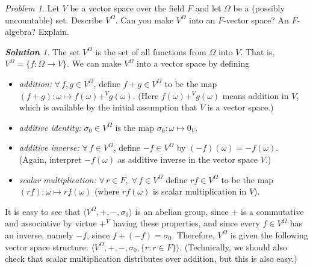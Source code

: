 \documentclass[11pt]{paper}
\theoremstyle{remark}
\newtheorem{problem}{Problem}
\newtheorem*{solution}{{\bf Solution}}
\newcommand\0{\ensuremath{\mathbf{0}}}
\newcommand{\<}{\ensuremath{\langle}}
\renewcommand{\>}{\ensuremath{\rangle}}
\begin{document}
\begin{problem}
Let $V$ be a vector space over the field $F$ and let $\Omega$ be a (possibly
uncountable) set.  Describe $V^\Omega$.  Can you make 
$V^\Omega$ into an  $F$-vector space?  An $F$-algebra? Explain.
\end{problem}
\begin{solution}
The set $V^\Omega$ is the set of all functions from $\Omega$ into $V$. 
That is, $V^\Omega = \{f : \Omega \rightarrow V\}$. We can make $V^\Omega$ into a
vector space by defining
\begin{itemize}
\item {\it addition:} 
  $\forall \,f, g \in V^\Omega$, define 
  $f + g \in V^\Omega$ to be the map $(f+g):\omega \mapsto f(\omega) +^V
  g(\omega)$.
(Here $f(\omega) +^V g(\omega)$ means addition in $V$, which is available by the initial assumption that $V$ is a vector space.)
\item {\it additive identity:}
  $\sigma_0 \in V^\Omega$ is the map $\sigma_0:\omega \mapsto 0_V$.
\item   {\it additive inverse:}
  $\forall \, f\in V^\Omega$, define $-f \in V^\Omega$ by
  $(-f)(\omega) = - f(\omega)$. (Again,
  interpret $-f(\omega)$ as additive inverse in the vector space $V$.)
\item {\it scalar multiplication:} $\forall \, r\in F, \; \forall \,f\in V^\Omega$ 
  define $rf \in V^\Omega$ to be the map  $(rf): \omega \mapsto r
  f(\omega)$ (where $r f(\omega)$ is scalar multiplication in
  $V$).
\end{itemize}

It is easy to see that $\<V^\Omega, +, -, \sigma_0\>$ is an abelian group,
since $+$ is a commutative and associative by virtue $+^V$ having these
properties, and since every $f \in V^\Omega$ has an inverse, namely $-f$, 
since $f + (-f) = \sigma_0$. %
Therefore, $V^\Omega$ is given the following vector space structure:
$\<V^\Omega, +, -, \sigma_0, \{r : r \in F\}\>$.  (Technically, we should also
check that scalar multiplication distributes over addition, but this is also
easy.)


\end{solution}
\end{document}
